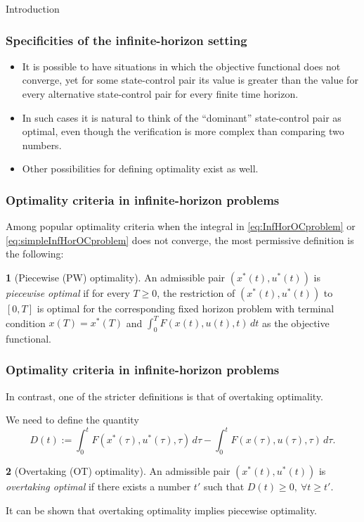 \documentclass[10pt]{beamer}
\theoremstyle{definition}
\newtheorem{definition}{\translate{Definition}}
\begin{document}
\begin{section}{Introduction}
\begin{frame}[fragile]
\frametitle{Specificities of the infinite-horizon setting}
\begin{itemize}\itemsep1em
\item It is possible to have situations in which the objective functional does not converge, yet for some state-control pair its value is greater than the value for every alternative state-control pair for every finite time horizon.
\item In such cases it is natural to think of the ``dominant'' state-control pair as optimal, even though the verification is more complex than comparing two numbers.
\item Other possibilities for defining optimality exist as well.
\end{itemize}
\end{frame}

\begin{frame}[fragile]
\frametitle{Optimality criteria in infinite-horizon problems}
Among popular optimality criteria when the integral in \eqref{eq:InfHorOCproblem} or \eqref{eq:simpleInfHorOCproblem} does not converge, the most permissive definition is the following:
\begin{definition}[Piecewise (PW) optimality]
An admissible pair $ (x^*(t),u^*(t)) $ is \emph{piecewise optimal} if for every $ T\geq 0 $, the restriction of $ (x^*(t),u^*(t)) $ to $ [0,T] $ is optimal for the corresponding fixed horizon problem with terminal condition $ x(T)=x^*(T) $ and $ \int_{0}^{T}F(x(t),u(t),t)\,dt $ as the objective functional.
\label{def:PWopt}
\end{definition}
\end{frame}

\begin{frame}[fragile]
\frametitle{Optimality criteria in infinite-horizon problems}
In contrast, one of the stricter definitions is that of overtaking optimality.

We need to define the quantity \[ D(t):= \int_{0}^{t}F(x^*(\tau),u^*(\tau),\tau)\,d\tau - \int_{0}^{t}F(x(\tau),u(\tau),\tau)\,d\tau.\]

\begin{definition}[Overtaking (OT) optimality]
An admissible pair $ (x^*(t),u^*(t)) $ is \emph{overtaking optimal} if there exists a number $ t' $ such that $ D(t)\geq 0,~ \forall t\geq t'. $
\label{def:OTopt}
\end{definition}\bigskip

It can be shown that overtaking optimality implies piecewise optimality.\bigskip


\end{frame}
\end{section}
\end{document}
